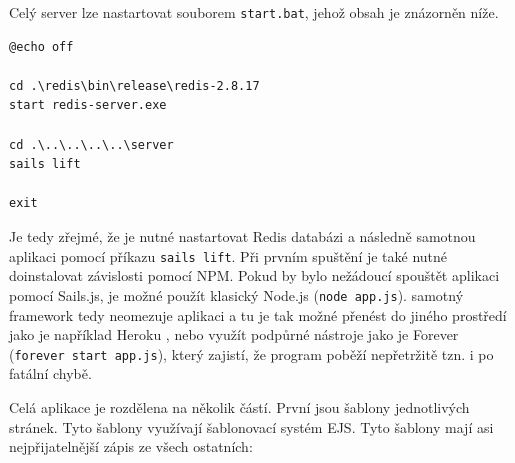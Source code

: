 \begin{figure}[H]
\end{figure}

Celý server lze nastartovat souborem \texttt{start.bat}, jehož obsah je zná\-zor\-něn níže.

\begin{verbatim}
@echo off

cd .\redis\bin\release\redis-2.8.17
start redis-server.exe

cd .\..\..\..\..\server
sails lift

exit
\end{verbatim}

Je tedy zřejmé, že je nutné nastartovat Redis databázi a následně samotnou aplikaci pomocí příkazu \texttt{sails lift}. Při prvním spuštění je také nutné doinstalovat závislosti pomocí NPM. Pokud by bylo nežádoucí spouštět aplikaci pomocí Sails.js, je možné použít klasický Node.js (\texttt{node app.js}). samotný framework tedy neomezuje aplikaci a tu je tak možné přenést do jiného prostředí jako je například Heroku \cite{heroku}, nebo využít podpůrné nástroje jako je Forever \cite{forever} (\texttt{forever start app.js}), který zajistí, že program poběží nepřetržitě tzn. i po fatální chybě.

Celá aplikace je rozdělena na několik částí. První jsou šablony jednotlivých stránek. Tyto šablony využívají šablonovací systém EJS. Tyto šablony mají asi nejpřijatelnější zápis ze všech ostatních:

